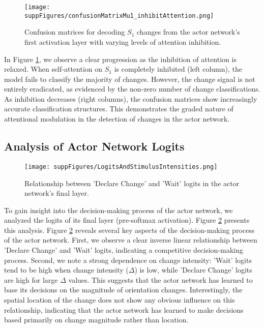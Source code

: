 \documentclass[12pt]{article}
\begin{document}
\begin{figure}[htbp]
    \centering
    \texttt{[image: suppFigures/confusionMatrixMu1\_inhibitAttention.png]}
    \caption{Confusion matrices for decoding $S_1$ changes from the actor network's first activation layer with varying levels of attention inhibition.}
    \label{fig:ActorLayer1ActivationS1Changes}
\end{figure}

In Figure \ref{fig:ActorLayer1ActivationS1Changes}, we observe a clear progression as the inhibition of attention is relaxed. When self-attention on $S_1$ is completely inhibited (left column), the model fails to classify the majority of changes. However, the change signal is not entirely eradicated, as evidenced by the non-zero number of change classifications. As inhibition decreases (right columns), the confusion matrices show increasingly accurate classification structures. This demonstrates the graded nature of attentional modulation in the detection of changes in the actor network.

\subsection{Analysis of Actor Network Logits}



\begin{figure}[htbp]
    \centering
    \texttt{[image: suppFigures/LogitsAndStimulusIntensities.png]}
    \caption{Relationship between 'Declare Change' and 'Wait' logits in the actor network's final layer.}
    \label{fig:LogitsChangeLocation}
\end{figure}

To gain insight into the decision-making process of the actor network, we analyzed the logits of its final layer (pre-softmax activation). Figure \ref{fig:LogitsChangeLocation} presents this analysis. Figure \ref{fig:LogitsChangeLocation} reveals several key aspects of the decision-making process of the actor network. First, we observe a clear inverse linear relationship between 'Declare Change' and 'Wait' logits, indicating a competitive decision-making process. Second, we note a strong dependence on change intensity: 'Wait' logits tend to be high when change intensity ($\Delta$) is low, while 'Declare Change' logits are high for large $\Delta$ values. This suggests that the actor network has learned to base its decisions on the magnitude of orientation changes. Interestingly, the spatial location of the change does not show any obvious influence on this relationship, indicating that the actor network has learned to make decisions based primarily on change magnitude rather than location.
\end{document}
